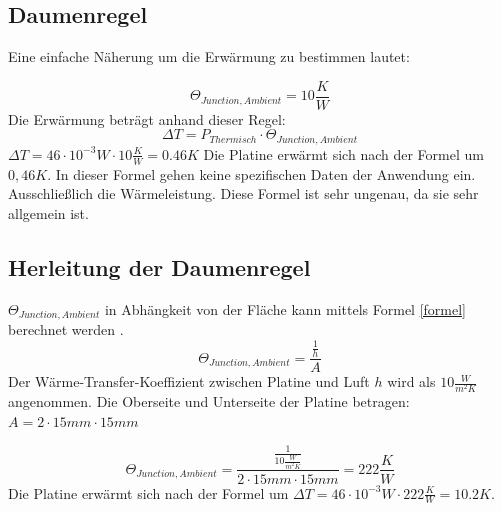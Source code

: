 \documentclass[10pt,a4paper,oneside,abstracton]{scrartcl}
\begin{document}
\begin{multicols}{2}
\subsection{Daumenregel}
Eine einfache Näherung um die Erwärmung zu bestimmen lautet: 

\begin{equation}
	\Theta_{Junction, Ambient} = 10 \frac{K }{W} 
\end{equation} 
Die Erwärmung beträgt anhand dieser Regel: 
	\begin{equation}
		\Delta T = P_{Thermisch} \cdot \Theta_{Junction, Ambient}
	\end{equation}
\noindent
	$\Delta T = 46 \cdot 10^{-3} W \cdot 10 \frac{K }{W} = 0.46 K  $ 
	Die Platine erwärmt sich nach der Formel um $ 0,46 K$.
In dieser Formel gehen keine spezifischen Daten der Anwendung ein. Ausschließlich die Wärmeleistung. 
Diese Formel ist sehr ungenau, da sie sehr allgemein ist. 

\subsection{Herleitung der Daumenregel}
$\Theta_{Junction, Ambient}$ in Abhängkeit von der Fläche kann mittels Formel \ref*{formel} berechnet werden . 
\begin{equation}
	\Theta_{Junction, Ambient} = \frac{\frac{1}{h}}{A}
	\label{formel}
\end{equation}
Der Wärme-Transfer-Koeffizient zwischen Platine und Luft $ h $ wird als $10 \frac{W}{m^2K}$ angenommen.\newline
Die Oberseite und Unterseite der Platine betragen: \newline
$A = 2\cdot 15mm \cdot 15mm$

\begin{equation}
	\Theta_{Junction, Ambient} = \frac{\frac{1}{10 \frac{W}{m^2K}}}{ 2\cdot 15mm \cdot 15mm} = 222 \frac{K}{W}
	\label{formel}
\end{equation}
Die Platine erwärmt sich nach der Formel um \newline
$\Delta T = 46 \cdot 10^{-3} W \cdot 222 \frac{K }{W} = 10.2 K  $.


\end{multicols}
\end{document}
